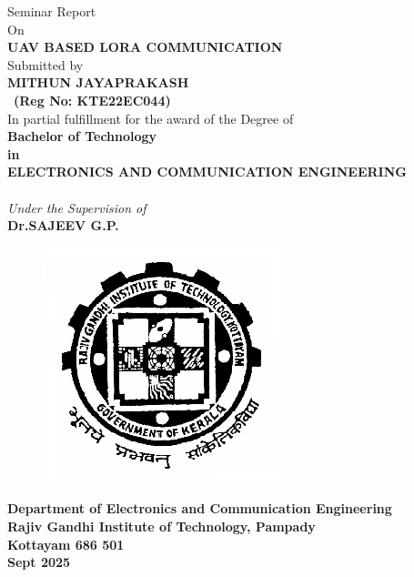 \begin{titlepage}
\begin{center}

\large{ Seminar Report}\\
\vspace{0.1in}
\small{On}\\
\vspace{0.1in}
\large{\textbf{UAV BASED LORA COMMUNICATION}}\\
\small{Submitted by\\}
\vspace{0.1in}
\large{\textbf{MITHUN JAYAPRAKASH}}\\
\ \textbf{(Reg No: KTE22EC044)}\\
\vspace{0.1in}
\small{In partial fulfillment for the award of the Degree of \vspace{0.2in}\\ \textbf{Bachelor of Technology\\in\\ELECTRONICS AND COMMUNICATION ENGINEERING \\}}
\vspace{0.15in}
\large{\textit{\\Under the Supervision of } \\ \textbf{Dr.SAJEEV G.P.\\}}
\vspace{.11in}
\begin{figure}[h]
\begin{center}
\includegraphics[width=0.25\paperwidth, height=0.25\paperheight,keepaspectratio]{logo.png}
\end{center}
\end{figure}
\textbf{Department of Electronics and Communication Engineering\\
Rajiv Gandhi Institute of Technology, Pampady \\
Kottayam 686 501\\ Sept 2025 }
\end{center}
\end{titlepage}

